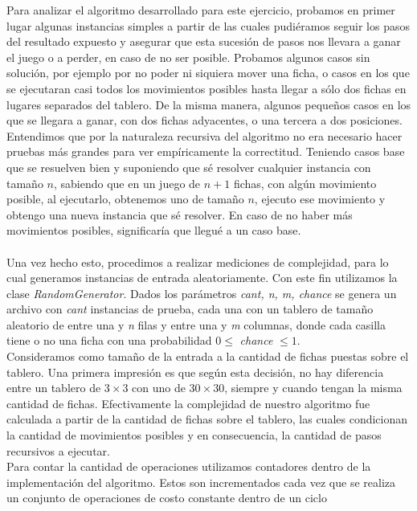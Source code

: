 \documentclass[10pt, a4paper,english,spanish]{article}
\begin{document}
\indent Para analizar el algoritmo desarrollado para este ejercicio, probamos en primer lugar algunas instancias simples
a partir de las cuales pudiéramos seguir los pasos del resultado expuesto y asegurar que esta sucesión de pasos 
nos llevara a ganar el juego o a perder, en caso de no ser posible. Probamos algunos casos sin solución,
por ejemplo por no poder ni siquiera mover una ficha, o casos en los que se ejecutaran casi todos los movimientos
posibles hasta llegar a sólo dos fichas en lugares separados del tablero. De la misma manera, algunos pequeños
casos en los que se llegara a ganar, con dos fichas adyacentes, o una tercera a dos posiciones. \\ 
\indent Entendimos que por la naturaleza recursiva del algoritmo no era necesario hacer pruebas más grandes
para ver empíricamente la correctitud. Teniendo casos base que se resuelven bien y
suponiendo que sé resolver cualquier instancia con tamaño $n$, 
sabiendo que en un juego de $n+1$ fichas, con algún movimiento posible, al ejecutarlo,
obtenemos uno de tamaño $n$, 
ejecuto ese movimiento y obtengo una nueva instancia que sé resolver. En caso de no haber
más movimientos posibles, significaría que llegué a un caso base. 
\\\\
\indent Una vez hecho esto, procedimos a realizar mediciones de complejidad, para lo cual generamos instancias de entrada aleatoriamente. 
Con este fin utilizamos la clase \textit{RandomGenerator}. Dados los parámetros \textit{cant, n, m, chance} se genera un archivo con \textit{cant} instancias de 
prueba, cada una con un tablero de tamaño aleatorio de entre una y \textit{n} filas y entre una y \textit{m} columnas, 
donde cada casilla tiene o no una ficha con una probabilidad $0 \leq $ \textit{chance} $\leq 1$.
\\
\indent Consideramos como tamaño de la entrada a la cantidad de fichas puestas sobre el tablero. Una primera impresión es que según esta decisión, no hay diferencia
entre un tablero de $3\times 3$ con uno de $30\times 30$, siempre y cuando tengan la misma cantidad de fichas. Efectivamente la complejidad de nuestro algoritmo
fue calculada a partir de la cantidad de fichas sobre el tablero, las cuales condicionan la cantidad de movimientos posibles y en consecuencia, la cantidad de 
pasos recursivos a ejecutar.
\\
\indent Para contar la cantidad de operaciones utilizamos contadores dentro 
de la implementación del algoritmo. Estos son incrementados cada vez que se realiza un conjunto de operaciones de costo constante dentro de un ciclo
\end{document}
